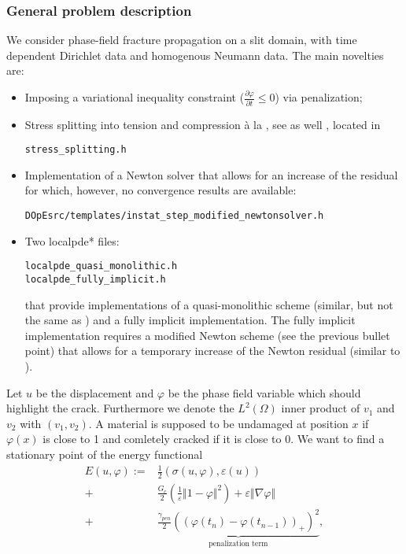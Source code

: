 \subsubsection{General problem description}
We consider phase-field fracture propagation on a slit domain, with time dependent 
Dirichlet data and homogenous Neumann data.
The main novelties are:
\begin{itemize}
\item Imposing a variational inequality constraint ($\frac{\partial \varphi}{\partial t} \leq 0$)
via penalization;
\item Stress splitting into tension and compression \`a
la \cite{MieWelHof10a}, see as well \cite{AmorMarigoMaurini2009}, located 
in 
\begin{verbatim}
stress_splitting.h
\end{verbatim}
\item Implementation of a Newton solver that 
allows for an increase of the residual for which, however,
no convergence results are available:
\begin{verbatim}
DOpEsrc/templates/instat_step_modified_newtonsolver.h
\end{verbatim}
\item Two localpde* files:
\begin{verbatim}
localpde_quasi_monolithic.h
localpde_fully_implicit.h
\end{verbatim}
that provide implementations of a quasi-monolithic scheme (similar, but not
the same as \cite{HeWheWi15}) and a fully implicit implementation.
The fully implicit implementation requires a modified Newton scheme (see the
previous bullet point) that 
allows for a temporary increase of the Newton residual (similar to \cite{Wi17_pff_error_oriented_Newton}).
\end{itemize}
Let $u$ be the displacement and $\varphi$ be the phase field variable which should highlight the crack.
Furthermore we denote the $L^2(\Omega)$ inner product of $v_1$ and $v_2$ with $(v_1,v_2)$.
A material is supposed to be undamaged at position $x$ if $\varphi(x)$ is close to 1 and comletely cracked
if it is close to $0$.
We want to find a stationary point of the energy functional
\begin{align*}
E(u, \varphi):=& \frac{1}{2}(\sigma(u,\varphi),\varepsilon(u)) \\
+&\frac{G_c}{2}(\frac{1}{\varepsilon} \Vert 1 - \varphi \Vert^2)+\varepsilon \Vert \nabla \varphi  \Vert\\
+&\underbrace{\frac{\gamma_{pen}}{2} ((\varphi(t_n)-\varphi(t_{n-1}))_+)^2}_{\text{penalization term}},
\end{align*}

